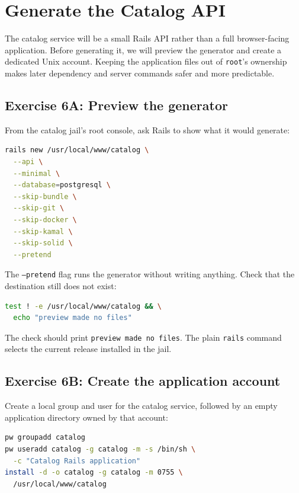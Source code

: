 \chapter{Generate the Catalog API}

The catalog service will be a small Rails API rather than a full browser-facing
application. Before generating it, we will preview the generator and create a
dedicated Unix account. Keeping the application files out of \texttt{root}'s
ownership makes later dependency and server commands safer and more
predictable.

\section{Exercise 6A: Preview the generator}

From the catalog jail's root console, ask Rails to show what it would generate:

\begin{lstlisting}[language=sh]
rails new /usr/local/www/catalog \
  --api \
  --minimal \
  --database=postgresql \
  --skip-bundle \
  --skip-git \
  --skip-docker \
  --skip-kamal \
  --skip-solid \
  --pretend
\end{lstlisting}

The \texttt{--pretend} flag runs the generator without writing anything. Check
that the destination still does not exist:

\begin{lstlisting}[language=sh]
test ! -e /usr/local/www/catalog && \
  echo "preview made no files"
\end{lstlisting}

The check should print \texttt{preview made no files}. The plain
\texttt{rails} command selects the current release installed in the jail.

\section{Exercise 6B: Create the application account}

Create a local group and user for the catalog service, followed by an empty
application directory owned by that account:

\begin{lstlisting}[language=sh]
pw groupadd catalog
pw useradd catalog -g catalog -m -s /bin/sh \
  -c "Catalog Rails application"
install -d -o catalog -g catalog -m 0755 \
  /usr/local/www/catalog
\end{lstlisting}

